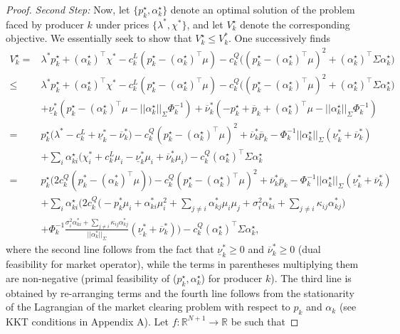 \documentclass{article}
\begin{document}
\begin{proof}
\textit{Second Step:} Now, let $\{p_k^\star, \alpha_k^\star\}$ denote an optimal solution of the problem faced by producer $k$ under prices $\{\lambda^*, \chi^*\}$, and let $V_k^\star$ denote the corresponding objective. We essentially seek to show that $V_k^\star \le V_k^*$. One successively finds
\begin{align*}
    V_k^\star =& \lambda^*p_k^\star + (\alpha_k^\star)^\top \chi^* - c_k^L(p_k^\star - (\alpha_k^\star)^\top \mu) - c_k^Q\big((p_k^\star - (\alpha_k^\star)^\top \mu)^2 + (\alpha_k^\star)^\top \Sigma \alpha_k^\star\big)\\
    \le& \lambda^*p_k^\star + (\alpha_k^\star)^\top \chi^* - c_k^L(p_k^\star - (\alpha_k^\star)^\top \mu) - c_k^Q\big((p_k^\star - (\alpha_k^\star)^\top \mu)^2 + (\alpha_k^\star)^\top \Sigma \alpha_k^\star\big)\\
    &+ \underline{\nu}_k^*(p_k^\star - (\alpha_k^\star)^\top \mu - ||\alpha_k^\star||_{\Sigma} \Phi_k^{-1}) + \overline{\nu}_k^* (-p_k^\star + \overline{p}_k + (\alpha_k^\star)^\top \mu - ||\alpha_k^\star||_{\Sigma} \Phi_k^{-1})\\
    =& p_k^\star\big(\lambda^* - c_k^L + \underline{\nu}_k^* - \overline{\nu}_k^*\big) - c_k^Q(p_k^\star - (\alpha_k^\star)^\top \mu)^2 + \overline{\nu}_k^* \overline{p}_k - \Phi_k^{-1} ||\alpha_k^\star||_\Sigma (\underline{\nu}_k^* + \overline{\nu}_k^*)\\
    &+ \sum_i \alpha_{ki}^\star\big(\chi_i^* + c_k^L \mu_i - \underline{\nu}_k^* \mu_i + \overline{\nu}_k^* \mu_i\big) - c_k^Q (\alpha_k^\star)^\top \Sigma \alpha_k^\star \\
   =& p_k^\star\big(2c_k^Q(p_k^* - (\alpha_k^*)^\top \mu)\big) - c_k^Q(p_k^\star - (\alpha_k^\star)^\top \mu)^2 + \overline{\nu}_k^* \overline{p}_k - \Phi_k^{-1} ||\alpha_k^\star||_\Sigma (\underline{\nu}_k^* + \overline{\nu}_k^*)\\    
   &+ \sum_i \alpha_{ki}^\star \Big(2c_k^Q\big(- p_k^* \mu_i + \alpha_{ki}^*\mu_i^2 + \sum_{j \ne i} \alpha_{kj}^* \mu_i \mu_j + \sigma_i^2 \alpha_{ki}^* + \sum_{j \ne i} \kappa_{ij} \alpha_{kj}^*\big) \\
    &+ \Phi_k^{-1} \frac{\sigma_i^2 \alpha_{ki}^* + \sum_{j \ne i} \kappa_{ij} \alpha_{kj}^*}{||\alpha_k^*||_\Sigma}(\underline{\nu}_k^* +\overline{\nu}_k^*)\Big) - c_k^Q (\alpha_k^\star)^\top\Sigma \alpha_k^\star,
\end{align*}
where the second line follows from the fact that $\underline{\nu}_k^* \ge 0$ and $\overline{\nu}_k^* \ge 0$ (dual feasibility for market operator), while the terms in parentheses multiplying them are non-negative (primal feasibility of ($p_k^\star, \alpha_k^\star$) for producer $k$). The third line is obtained by re-arranging terms and the fourth line follows from the stationarity of the Lagrangian of the market clearing problem with respect to $p_k$ and $\alpha_k$ (see KKT conditions in Appendix A). Let $f:\mathbb{R}^{N+1} \rightarrow \mathbb{R}$ be such that

\end{proof}
\end{document}
